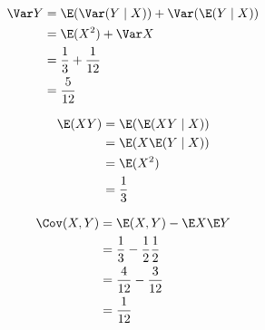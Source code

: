 \begin{solution}
\begin{enumerate}[label = (\alph*)]
    \begin{align*}
        \Var Y
        & =
        \E(\Var(Y \mid X)) + \Var(\E(Y \mid X)) \\
        & =
        \E(X^2) + \Var X \\
        & =
        \frac{1}{3} + \frac{1}{12} \\
        & =
        \frac{5}{12}
    \end{align*}

    \begin{align*}
        \E(X Y)
        & =
        \E(\E(X Y \mid X)) \\
        & =
        \E(X \E(Y \mid X)) \\
        & =
        \E(X^2) \\
        & =
        \frac{1}{3}
    \end{align*}

    \begin{align*}
        \Cov(X, Y)
        & =
        \E(X, Y) - \E X \E Y \\
        & =
        \frac{1}{3} - \frac{1}{2} \frac{1}{2} \\
        & =
        \frac{4}{12} - \frac{3}{12} \\
        & =
        \frac{1}{12}
    \end{align*}

\end{enumerate}

\end{solution}

